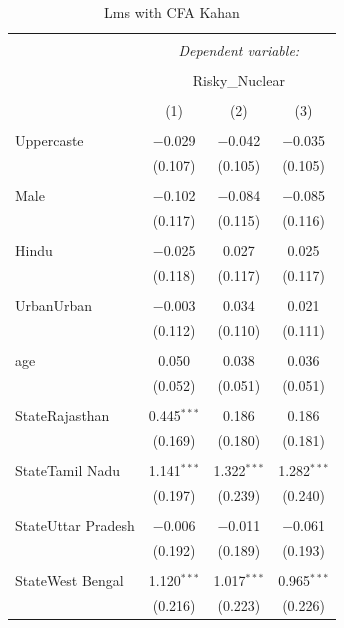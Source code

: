 \documentclass[
]{article}
\begin{document}
\begin{table}[!htbp] \centering 
  \caption{Lms with CFA Kahan} 
  \label{} 
\begin{tabular}{@{\extracolsep{5pt}}lccc} 
\\[-1.8ex]\hline 
\hline \\[-1.8ex] 
 & \multicolumn{3}{c}{\textit{Dependent variable:}} \\ 
\cline{2-4} 
\\[-1.8ex] & \multicolumn{3}{c}{Risky\_Nuclear} \\ 
\\[-1.8ex] & (1) & (2) & (3)\\ 
\hline \\[-1.8ex] 
 Uppercaste & $-$0.029 & $-$0.042 & $-$0.035 \\ 
  & (0.107) & (0.105) & (0.105) \\ 
  & & & \\ 
 Male & $-$0.102 & $-$0.084 & $-$0.085 \\ 
  & (0.117) & (0.115) & (0.116) \\ 
  & & & \\ 
 Hindu & $-$0.025 & 0.027 & 0.025 \\ 
  & (0.118) & (0.117) & (0.117) \\ 
  & & & \\ 
 UrbanUrban & $-$0.003 & 0.034 & 0.021 \\ 
  & (0.112) & (0.110) & (0.111) \\ 
  & & & \\ 
 age & 0.050 & 0.038 & 0.036 \\ 
  & (0.052) & (0.051) & (0.051) \\ 
  & & & \\ 
 StateRajasthan & 0.445$^{***}$ & 0.186 & 0.186 \\ 
  & (0.169) & (0.180) & (0.181) \\ 
  & & & \\ 
 StateTamil Nadu & 1.141$^{***}$ & 1.322$^{***}$ & 1.282$^{***}$ \\ 
  & (0.197) & (0.239) & (0.240) \\ 
  & & & \\ 
 StateUttar Pradesh & $-$0.006 & $-$0.011 & $-$0.061 \\ 
  & (0.192) & (0.189) & (0.193) \\ 
  & & & \\ 
 StateWest Bengal & 1.120$^{***}$ & 1.017$^{***}$ & 0.965$^{***}$ \\ 
  & (0.216) & (0.223) & (0.226) \\ 

\end{tabular}
\end{table}
\end{document}
